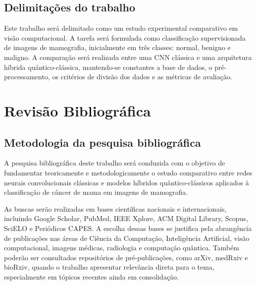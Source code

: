 \documentclass[
    12pt,
    openright,
    oneside,
    a4paper,
    english,
    brazil
]{abntex2}
\begin{document}
\section{Delimitações do trabalho}

Este trabalho será delimitado como um estudo experimental comparativo em visão computacional. A tarefa será formulada como classificação supervisionada de imagens de mamografia, inicialmente em três classes: normal, benigno e maligno. A comparação será realizada entre uma CNN clássica e uma arquitetura híbrida quântico-clássica, mantendo-se constantes a base de dados, o pré-processamento, os critérios de divisão dos dados e as métricas de avaliação.

\chapter{Revisão Bibliográfica}

\section{Metodologia da pesquisa bibliográfica}

A pesquisa bibliográfica deste trabalho será conduzida com o objetivo de fundamentar teoricamente e metodologicamente o estudo comparativo entre redes neurais convolucionais clássicas e modelos híbridos quântico-clássicos aplicados à classificação de câncer de mama em imagens de mamografia.

As buscas serão realizadas em bases científicas nacionais e internacionais, incluindo Google Scholar, PubMed, IEEE Xplore, ACM Digital Library, Scopus, SciELO e Periódicos CAPES. A escolha dessas bases se justifica pela abrangência de publicações nas áreas de Ciência da Computação, Inteligência Artificial, visão computacional, imagens médicas, radiologia e computação quântica. Também poderão ser consultados repositórios de pré-publicações, como arXiv, medRxiv e bioRxiv, quando o trabalho apresentar relevância direta para o tema, especialmente em tópicos recentes ainda em consolidação.
\end{document}
